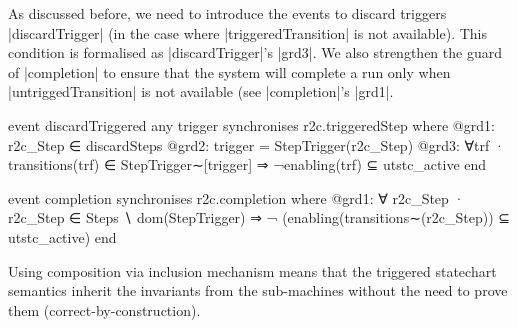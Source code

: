 As discussed before, we need to introduce the events to discard triggers |discardTrigger| (in the case where |triggeredTransition| is not available). This condition is formalised as  |discardTrigger|'s |grd3|. We also strengthen the guard of |completion| to ensure that the system will complete a run only when |untriggedTransition| is not available (see |completion|'s |grd1|.
\begin{center}
    \begin{minipage}[t]{0.50\textwidth}
\begin{EventBcode}
event discardTriggered
any trigger
synchronises r2c.triggeredStep
where
    @grd1: r2c_Step ∈ discardSteps
    @grd2: trigger = StepTrigger(r2c_Step)
    @grd3: ∀trf · transitions(trf) ∈ StepTrigger∼[{trigger}] ⇒ ¬enabling(trf) ⊆ utstc_active  
end
\end{EventBcode}
    \end{minipage}
    \hfill
    \begin{minipage}[t]{0.48\textwidth}
\begin{EventBcode}
event completion
synchronises r2c.completion
where
    @grd1: 
        ∀ r2c_Step · r2c_Step ∈ Steps ∖ dom(StepTrigger)
	⇒
    ¬ (enabling(transitions∼(r2c_Step)) ⊆ utstc_active)
	end
\end{EventBcode}
    \end{minipage}
\end{center}

Using composition via inclusion mechanism means that the triggered statechart semantics inherit the invariants from the sub-machines without the need to prove them (correct-by-construction).


